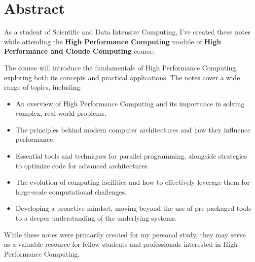 \chapter*{Abstract}

As a student of Scientific and Data Intensive Computing, I've created these notes while attending the \textbf{High Performance Computing} module of \textbf{High Performance and Cloude Computing} course.

The course will introduce the fundamentals of High Performance Computing, exploring both its concepts and practical applications. The notes cover a wide range of topics, including:

\begin{itemize}
    \item An overview of High Performance Computing and its importance in solving complex, real-world problems.
    \item The principles behind modern computer architectures and how they influence performance.
    \item Essential tools and techniques for parallel programming, alongside strategies to optimize code for advanced architectures.
    \item The evolution of computing facilities and how to effectively leverage them for large-scale computational challenges.
    \item Developing a proactive mindset, moving beyond the use of pre-packaged tools to a deeper understanding of the underlying systems.
\end{itemize}
    
While these notes were primarily created for my personal study, they may serve as a valuable resource for fellow students and professionals interested in High Performance Computing.